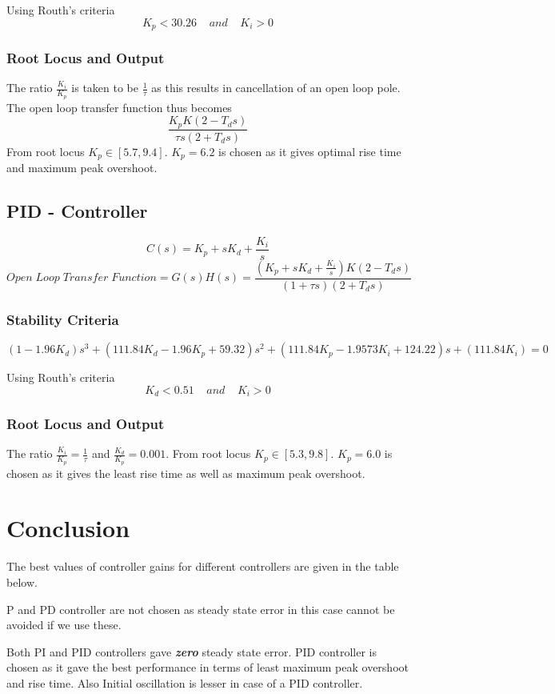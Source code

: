 \documentclass{article}
\begin{document}
Using Routh's criteria
\[ K_p < 30.26 \;\;\;\; and \;\;\;\; K_i > 0\]

\subsubsection{Root Locus and Output}
The ratio $\frac{K_i}{K_p}$ is taken to be $\frac{1}{\tau}$ as this results in cancellation of an open loop pole. The open loop transfer function thus becomes
\[ \frac{K_p K(2 - T_d s)}{\tau s(2 + T_d s)}\]
From root locus $K_p \in [5.7,9.4]$. $K_p = 6.2$ is chosen as it gives optimal rise time and maximum peak overshoot.


\subsection{PID - Controller}
\[C(s) = K_p + s K_d+ \frac{K_i}{s}\]
\[Open \; Loop \; Transfer \; Function = G(s)H(s) = \frac{(K_p + s K_d + \frac{K_i}{s})K(2 - T_d s)}{(1 + \tau s)(2 + T_d s)}\]

\subsubsection{Stability Criteria}
\[(1 - 1.96K_d) s^3 + (111.84K_d - 1.96K_p + 59.32)s^2 + (111.84K_p - 1.9573K_i + 124.22)s + (111.84K_i) = 0\]

Using Routh's criteria
\[ K_d < 0.51 \;\;\;\; and \;\;\;\; K_i > 0\]

\subsubsection{Root Locus and Output}
The ratio $\frac{K_i}{K_p} = \frac{1}{\tau}$ and $\frac{K_d}{K_p} = 0.001$. 
From root locus $K_p \in [5.3,9.8]$. $K_p = 6.0$ is chosen as it gives the least rise time as well as maximum peak overshoot.

\section{Conclusion}
The best values of controller gains for different controllers are given in the table below.

P and PD controller are not chosen as steady state error in this case cannot be avoided if we use these.

Both PI and PID controllers gave \textbf{\textit{zero}} steady state error.
PID controller is chosen as it gave the best performance in terms of least maximum peak overshoot and rise time. Also Initial oscillation is lesser in case of a PID controller.
\end{document}
